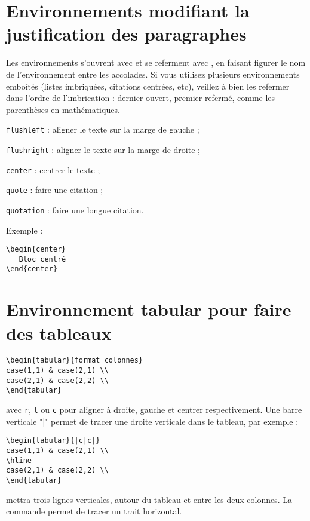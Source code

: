 \section{Environnements modifiant la justification des paragraphes}
Les environnements s'ouvrent avec \verbatim{\begin{***}} et se referment avec \verbatim{\end{***}}, en faisant figurer le nom de l'environnement entre les accolades. Si vous utilisez plusieurs environnements emboîtés (listes imbriquées, citations centrées, etc), veillez à bien les refermer dans l'ordre de l'imbrication : dernier ouvert, premier refermé, comme les parenthèses en mathématiques.
\item \texttt{flushleft} : aligner le texte sur la marge de gauche ;
\item \texttt{flushright} : aligner le texte sur la marge de droite ;
\item \texttt{center} : centrer le texte ;
\item \texttt{quote} : faire une citation ;
\item \texttt{quotation} : faire une longue citation.

Exemple :
\begin{verbatim}
\begin{center}
   Bloc centré
\end{center}
\end{verbatim}

\section{Environnement tabular pour faire des tableaux}
\begin{verbatim}
\begin{tabular}{format colonnes}
case(1,1) & case(2,1) \\
case(2,1) & case(2,2) \\
\end{tabular}
\end{verbatim}
avec \texttt{r}, \texttt{l} ou \texttt{c} pour aligner à droite, gauche et centrer respectivement. Une barre verticale "|" permet de tracer une droite verticale dans le tableau, par exemple :
\begin{verbatim}
\begin{tabular}{|c|c|}
case(1,1) & case(2,1) \\
\hline
case(2,1) & case(2,2) \\
\end{tabular}
\end{verbatim}
mettra trois lignes verticales, autour du tableau et entre les deux colonnes. La commande \texttt{\verbatim{\hline}} permet de tracer un trait horizontal.

